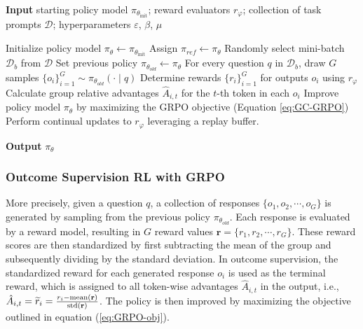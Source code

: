 \begin{itemize}[topsep=0pt]
\begin{itemize}[topsep=0pt]
\begin{algorithm}[t]
  \small
  \caption{Iterative Group Relative Policy Optimization}
  \textbf{Input} starting policy model $\pi_{\theta_{\text{init}}}$; reward evaluators $r_\varphi$; collection of task prompts $\mathcal{D}$; 
  hyperparameters $\varepsilon$, $\beta$, $\mu$
  \begin{algorithmic}[1]
    \State Initialize policy model $\pi_\theta \gets \pi_{\theta_{\text{init}}}$
       \State Assign $\pi_{ref} \gets \pi_{\theta}$
      \State Randomly select mini-batch $\mathcal{D}_b$ from $\mathcal{D}$
      \State Set previous policy $\pi_{\theta_{old}} \gets \pi_{\theta}$ 
      \State For every question $q$ in $\mathcal{D}_b$, draw $G$ samples $\{o_i\}_{i=1}^G \sim \pi_{\theta_{old}} (\cdot \mid q) $
      \State Determine rewards $\{r_i\}_{i=1}^{G}$ for outputs $o_i$ using $r_\varphi$
      \State Calculate group relative advantages $\hat{A}_{i,t}$ for the $t$-th token in each $o_i$
        \State Improve policy model $\pi_\theta$ by maximizing the GRPO objective (Equation \ref{eq:GC-GRPO})
      \EndFor
    \EndFor 
    \State Perform continual updates to $r_\varphi$ leveraging a replay buffer. 
    \EndFor 
  \end{algorithmic}
  \textbf{Output} $\pi_\theta$
  \label{alg:iter-grpo}
\end{algorithm}

\subsubsection{Outcome Supervision RL with GRPO} More precisely, given a question $q$, a collection of responses $\{o_1, o_2, \cdots, o_G\}$ is generated by sampling from the previous policy $\pi_{\theta_{old}}$. Each response is evaluated by a reward model, resulting in $G$ reward values $\mathbf{r} = \{r_1, r_2, \cdots, r_G\}$. These reward scores are then standardized by first subtracting the mean of the group and subsequently dividing by the standard deviation. In outcome supervision, the standardized reward for each generated response $o_i$ is used as the terminal reward, which is assigned to all token-wise advantages $\hat{A}_{i, t}$ in the output, i.e., $\hat{A}_{i, t} = \widetilde{r}_i = \frac{r_i- {\rm mean}(\mathbf{r})}{{\rm std}(\mathbf{r})}$. The policy is then improved by maximizing the objective outlined in equation (\ref{eq:GRPO-obj}).


\end{itemize}
\end{itemize}
